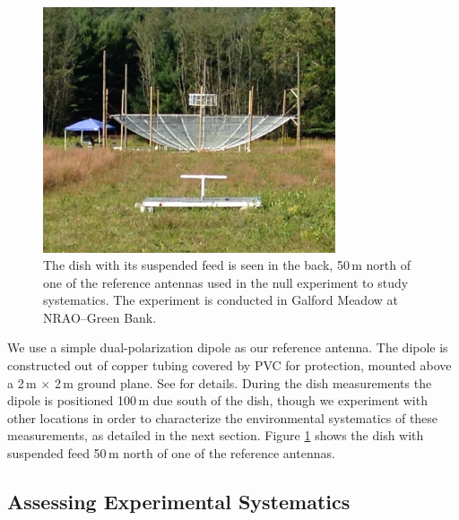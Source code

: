 \documentclass{emulateapj}
\begin{document}
\begin{figure}[h]
\includegraphics[width=3.4in]{ref_dipole_and_hera_dish.jpg}
\caption{The dish with its suspended feed is seen in the back, 50\,m north of one of the reference antennas used in the null experiment to study systematics. The experiment is conducted in Galford Meadow at NRAO--Green Bank.}
\label{fig:greenbankdishphoto}
\end{figure}

We use a simple dual-polarization dipole as our reference antenna. The dipole is constructed out of copper tubing covered by PVC for protection, mounted above a 2\,m $\times$ 2\,m ground plane. See \citet{neben15} for details. During the dish measurements the dipole is positioned 100\,m due south of the dish, though we experiment with other locations in order to characterize the environmental systematics of these measurements, as detailed in the next section. Figure \ref{fig:greenbankdishphoto} shows the dish with suspended feed 50\,m north of one of the reference antennas.

\subsection{Assessing Experimental Systematics}
\end{document}
